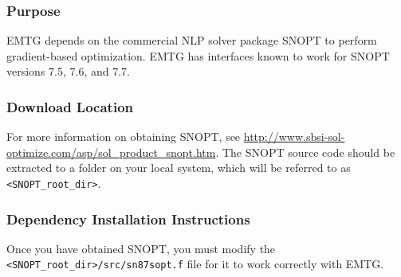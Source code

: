 
\subsubsection{Purpose}

\noindent \ac{EMTG} depends on the commercial \ac{NLP} solver package \ac{SNOPT} to perform gradient-based optimization. \ac{EMTG} has interfaces known to work for \ac{SNOPT} versions 7.5, 7.6, and 7.7. 

\subsubsection{Download Location}

For more information on obtaining \ac{SNOPT}, see \url{http://www.sbsi-sol-optimize.com/asp/sol_product_snopt.htm}. The \ac{SNOPT} source code should be extracted to a folder on your local system, which will be referred to as \texttt{<SNOPT\_root\_dir>}. 

\subsubsection{Dependency Installation Instructions}

Once you have obtained \ac{SNOPT}, you must modify the \texttt{<SNOPT\_root\_dir>/src/sn87sopt.f} file for it to work correctly with \ac{EMTG}.

